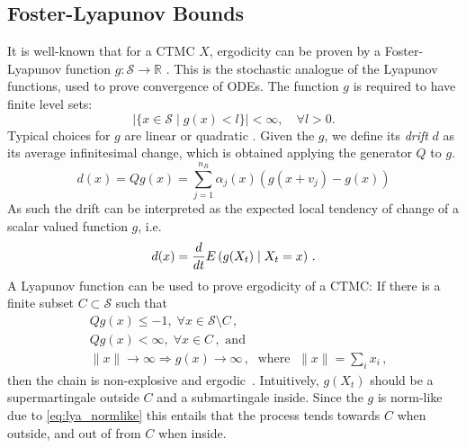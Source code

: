 \subsection{Foster-Lyapunov Bounds}\label{sec:statagg:lyapunov}
It is well-known that for a \ac{CTMC} $X$, ergodicity can be proven by a Foster-Lyapunov
 function $g:\mathcal{S}\to\mathbb{R}$ \cite{meyn1993stability,dayar2011bounding}.
 This is the stochastic analogue of the Lyapunov functions, used to prove convergence of \acp{ODE}.
The function $g$ is required to have finite level sets:
\[
	\left|\{x\in\mathcal{S} \mid g(x) < l\}\right|<\infty,\quad \forall l > 0.
\]
Typical choices for $g$ are linear \cite{gupta2014scalable,milias2014optimization} or quadratic \cite{spieler2014numerical}.
Given the $g$, we define its \emph{drift} $d$ as its average infinitesimal change, which is obtained applying the generator $Q$ to $g$.%
\begin{equation}\label{eq:drift}
	d(x) = Qg(x) = \sum_{j=1}^{n_R} \alpha_j(x) (g(x+v_j) -  g(x))
\end{equation}
As such the drift can be interpreted as the expected local tendency of change of a scalar valued function $g$, i.e.\ 
\[
	d(x) = \frac{d}{dt}{E}\left(g(X_t)\mid X_t = x\right)\,.
\]
A Lyapunov function can be used to prove ergodicity of a \ac{CTMC}: If there is a finite subset $C\subset\mathcal{S}$ such that
\begin{align}
	&Qg(x)\leq -1,\; \forall x\in\mathcal{S}\setminus C\,,\label{eq:neg_outside}\\
	&Qg(x)< \infty,\; \forall x\in C\,, \text{ and}\label{eq:pos_inside}\\
	&\lVert x\rVert\to\infty \Rightarrow g(x)\to\infty\,,\;\text{ where }\;\lVert x\rVert=\sum_i x_i\,,\label{eq:lya_normlike}
\end{align}
then the chain is non-explosive and ergodic~\cite{milias2014optimization,tweedie_1975}.
Intuitively, $g(X_t)$ should be a supermartingale outside $C$ and a submartingale inside.
Since the $g$ is norm-like due to \eqref{eq:lya_normlike} this entails that the process
tends towards $C$ when outside, and out of from $C$ when inside.



